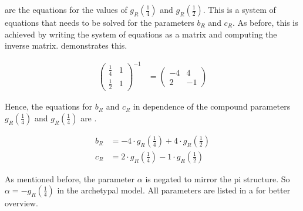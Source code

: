  are the equations for the values of $g_R\left(\frac{1}{4}\right)$ and $g_R\left(\frac{1}{2}\right)$.
This is a system of equations that needs to be solved for the parameters $b_R$ and $c_R$.
As before, this is achieved by writing the system of equations as a matrix and computing the inverse matrix.
 demonstrates this.

\begin{align}
	\begin{pmatrix}
		\frac{1}{4} & 1 \\
		\frac{1}{2} & 1
	\end{pmatrix}^{-1} & =
	\begin{pmatrix}
		-4 & 4  \\
		2  & -1
	\end{pmatrix}
	\label{equ:setup.arch.matrix}
\end{align}

Hence, the equations for $b_R$ and $c_R$ in dependence of the compound parameters $g_R\left(\frac{1}{4}\right)$ and $g_R\left(\frac{1}{4}\right)$ are .

\begin{align}
	b_R & = -4 \cdot g_R\left(\frac{1}{4}\right) + 4 \cdot g_R\left(\frac{1}{2}\right) \label{equ:setup.arch.bR} \\
	c_R & = 2 \cdot g_R\left(\frac{1}{4}\right) - 1 \cdot g_R\left(\frac{1}{2}\right) \label{equ:setup.arch.cR}
\end{align}



As mentioned before, the parameter $\alpha$ is negated to mirror the \gls{pi} structure.
So $\alpha = -g_R\left(\frac{1}{4}\right)$ in the archetypal model.
All parameters are listed in  a for better overview.

